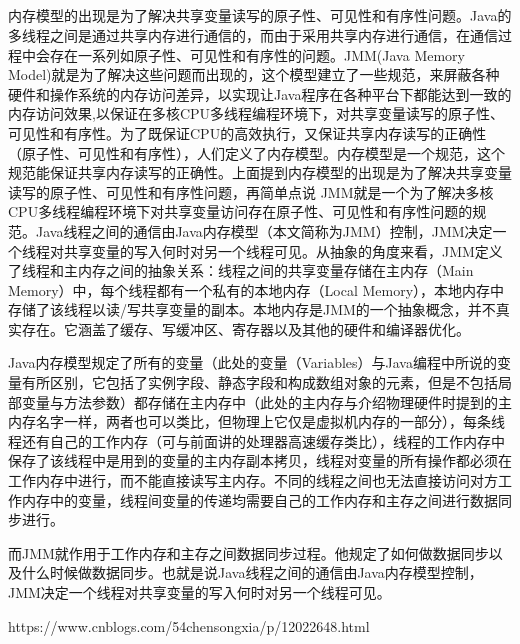 \documentclass[../../../interview-questions.tex]{subfiles}
\begin{document}
\subsection{\color{red}{Java内存模型(Java Memory Model)}}

内存模型的出现是为了解决共享变量读写的原子性、可见性和有序性问题。Java的多线程之间是通过共享内存进行通信的，而由于采用共享内存进行通信，在通信过程中会存在一系列如原子性、可见性和有序性的问题。JMM(Java Memory Model)就是为了解决这些问题而出现的，这个模型建立了一些规范，来屏蔽各种硬件和操作系统的内存访问差异，以实现让Java程序在各种平台下都能达到一致的内存访问效果,以保证在多核CPU多线程编程环境下，对共享变量读写的原子性、可见性和有序性。为了既保证CPU的高效执行，又保证共享内存读写的正确性（原子性、可见性和有序性），人们定义了内存模型。内存模型是一个规范，这个规范能保证共享内存读写的正确性。上面提到内存模型的出现是为了解决共享变量读写的原子性、可见性和有序性问题，再简单点说 JMM就是一个为了解决多核CPU多线程编程环境下对共享变量访问存在原子性、可见性和有序性问题的规范。Java线程之间的通信由Java内存模型（本文简称为JMM）控制，JMM决定一个线程对共享变量的写入何时对另一个线程可见。从抽象的角度来看，JMM定义了线程和主内存之间的抽象关系：线程之间的共享变量存储在主内存（Main Memory）中，每个线程都有一个私有的本地内存（Local Memory），本地内存中存储了该线程以读/写共享变量的副本。本地内存是JMM的一个抽象概念，并不真实存在。它涵盖了缓存、写缓冲区、寄存器以及其他的硬件和编译器优化。

Java内存模型规定了所有的变量（此处的变量（Variables）与Java编程中所说的变量有所区别，它包括了实例字段、静态字段和构成数组对象的元素，但是不包括局部变量与方法参数）都存储在主内存中（此处的主内存与介绍物理硬件时提到的主内存名字一样，两者也可以类比，但物理上它仅是虚拟机内存的一部分），每条线程还有自己的工作内存（可与前面讲的处理器高速缓存类比），线程的工作内存中保存了该线程中是用到的变量的主内存副本拷贝，线程对变量的所有操作都必须在工作内存中进行，而不能直接读写主内存。不同的线程之间也无法直接访问对方工作内存中的变量，线程间变量的传递均需要自己的工作内存和主存之间进行数据同步进行。

而JMM就作用于工作内存和主存之间数据同步过程。他规定了如何做数据同步以及什么时候做数据同步。也就是说Java线程之间的通信由Java内存模型控制， JMM决定一个线程对共享变量的写入何时对另一个线程可见。

https://www.cnblogs.com/54chensongxia/p/12022648.html
\end{document}
